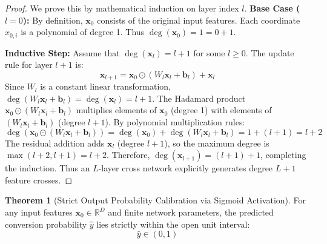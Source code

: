 \documentclass[11pt,a4paper]{article}
\theoremstyle{definition}
\newtheorem{theorem}{\textbf{Theorem}}[section]
\begin{document}
\begin{proof}
We prove this by mathematical induction on layer index $l$.
\textbf{Base Case ($l = 0$):}
By definition, $\mathbf{x}_0$ consists of the original input features. Each coordinate $x_{0, i}$ is a polynomial of degree 1. Thus $\operatorname{deg}(\mathbf{x}_0) = 1 = 0 + 1$.

\textbf{Inductive Step:}
Assume that $\operatorname{deg}(\mathbf{x}_l) = l + 1$ for some $l \ge 0$.
The update rule for layer $l+1$ is:
{\boldmath
\begin{equation}
\mathbf{x}_{l+1} = \mathbf{x}_0 \odot (W_l \mathbf{x}_l + \mathbf{b}_l) + \mathbf{x}_l
\end{equation}
}
Since $W_l$ is a constant linear transformation, $\operatorname{deg}(W_l \mathbf{x}_l + \mathbf{b}_l) = \operatorname{deg}(\mathbf{x}_l) = l + 1$.
The Hadamard product $\mathbf{x}_0 \odot (W_l \mathbf{x}_l + \mathbf{b}_l)$ multiplies elements of $\mathbf{x}_0$ (degree 1) with elements of $(W_l \mathbf{x}_l + \mathbf{b}_l)$ (degree $l + 1$).
By polynomial multiplication rules:
{\boldmath
\begin{equation}
\operatorname{deg}(\mathbf{x}_0 \odot (W_l \mathbf{x}_l + \mathbf{b}_l)) = \operatorname{deg}(\mathbf{x}_0) + \operatorname{deg}(W_l \mathbf{x}_l + \mathbf{b}_l) = 1 + (l + 1) = l + 2
\end{equation}
}
The residual addition adds $\mathbf{x}_l$ (degree $l + 1$), so the maximum degree is $\max(l + 2, l + 1) = l + 2$.
Therefore, $\operatorname{deg}(\mathbf{x}_{l+1}) = (l + 1) + 1$, completing the induction.
Thus an $L$-layer cross network explicitly generates degree $L + 1$ feature crosses.
\end{proof}

\begin{theorem}[Strict Output Probability Calibration via Sigmoid Activation]
For any input features $\mathbf{x}_0 \in \mathbb{R}^D$ and finite network parameters, the predicted conversion probability $\widehat{y}$ lies strictly within the open unit interval:
{\boldmath
\begin{equation}
\widehat{y} \in (0, 1)
\end{equation}
}
\end{theorem}
\end{document}
